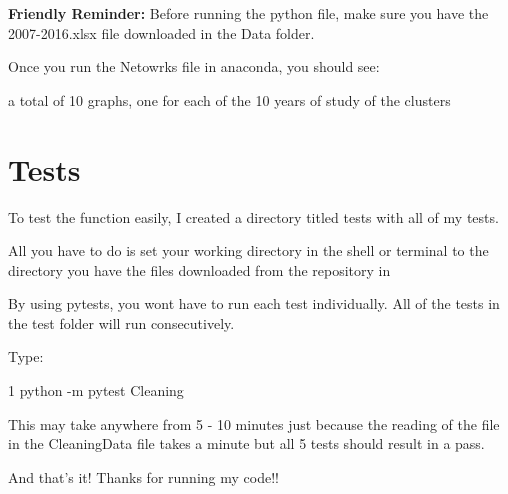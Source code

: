 {\bfseries Friendly Reminder\+:} Before running the python file, make sure you have the \textquotesingle{}2007-\/2016.\+xlsx\textquotesingle{} file downloaded in the Data folder.

Once you run the Netowrks file in anaconda, you should see\+:


\begin{DoxyItemize}
\item a total of 10 graphs, one for each of the 10 years of study of the clusters
\end{DoxyItemize}

\section*{Tests}

To test the function easily, I created a directory titled tests with all of my tests.

All you have to do is set your working directory in the shell or terminal to the directory you have the files downloaded from the repository in

By using pytests, you wont have to run each test individually. All of the tests in the test folder will run consecutively.

Type\+:


\begin{DoxyCode}
1 python -m pytest Cleaning
\end{DoxyCode}
 This may take anywhere from 5 -\/ 10 minutes just because the reading of the file in the Cleaning\+Data file takes a minute but all 5 tests should result in a pass.

And that’s it! Thanks for running my code!! 